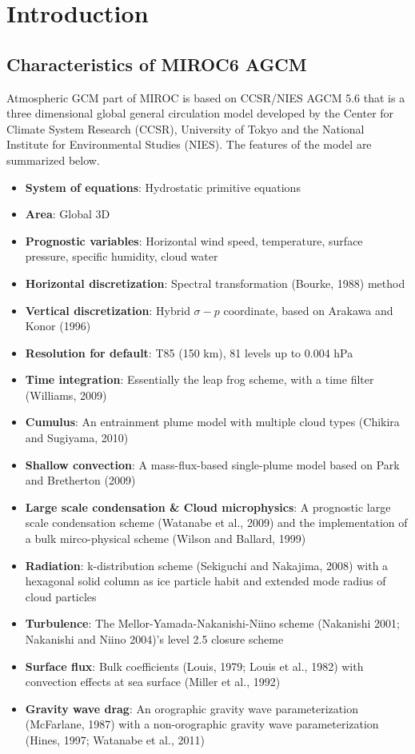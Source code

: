 \hypertarget{introduction}{%
\section{Introduction}\label{introduction}}

\hypertarget{characteristics-of-miroc6-agcm}{%
\subsection{Characteristics of MIROC6
AGCM}\label{characteristics-of-miroc6-agcm}}

Atmospheric GCM part of MIROC is based on CCSR/NIES AGCM 5.6 that is a
three dimensional global general circulation model developed by the
Center for Climate System Research (CCSR), University of Tokyo and the
National Institute for Environmental Studies (NIES). The features of the
model are summarized below.

\begin{itemize}
\tightlist
\item
  \textbf{System of equations}: Hydrostatic primitive equations
\item
  \textbf{Area}: Global 3D
\item
  \textbf{Prognostic variables}: Horizontal wind speed, temperature,
  surface pressure, specific humidity, cloud water
\item
  \textbf{Horizontal discretization}: Spectral transformation (Bourke,
  1988) method
\item
  \textbf{Vertical discretization}: Hybrid \(\sigma - p\) coordinate,
  based on Arakawa and Konor (1996)
\item
  \textbf{Resolution for default}: T85 (150 km), 81 levels up to 0.004
  hPa
\item
  \textbf{Time integration}: Essentially the leap frog scheme, with a
  time filter (Williams, 2009)
\item
  \textbf{Cumulus}: An entrainment plume model with multiple cloud types
  (Chikira and Sugiyama, 2010)
\item
  \textbf{Shallow convection}: A mass-flux-based single-plume model
  based on Park and Bretherton (2009)
\item
  \textbf{Large scale condensation \& Cloud microphysics}: A prognostic
  large scale condensation scheme (Watanabe et al., 2009) and the
  implementation of a bulk mirco-physical scheme (Wilson and Ballard,
  1999)
\item
  \textbf{Radiation}: k-distribution scheme (Sekiguchi and Nakajima,
  2008) with a hexagonal solid column as ice particle habit and extended
  mode radius of cloud particles
\item
  \textbf{Turbulence}: The Mellor-Yamada-Nakanishi-Niino scheme
  (Nakanishi 2001; Nakanishi and Niino 2004)'s level 2.5 closure scheme
\item
  \textbf{Surface flux}: Bulk coefficients (Louis, 1979; Louis et al.,
  1982) with convection effects at sea surface (Miller et al., 1992)
\item
  \textbf{Gravity wave drag}: An orographic gravity wave
  parameterization (McFarlane, 1987) with a non-orographic gravity wave
  parameterization (Hines, 1997; Watanabe et al., 2011)
\end{itemize}
